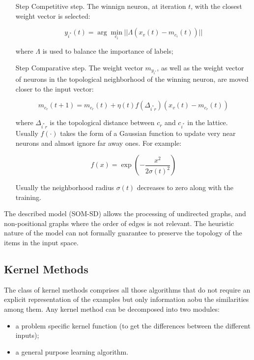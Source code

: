 \begin{enumerate}
	\item[Step] Competitive step. The winnign neuron, at
		iteration $t$, with the closest weight vector is selected:

		\begin{equation}
			y_{i^*}(t) = \arg \min_{c_i} || \Lambda (x_v(t) - m_{c_i}(t))||
		\end{equation}

		where $\Lambda$ is used to balance the importance of labels;

	\item[Step] Comparative step. The weight vector $m_{y_{i^*}}$, as well as
		the weight vector of neurons in the topological neighborhood of the 
		winning neuron, are moved closer to the input vector:

		\begin{equation}
			m_{c_r}(t+1) = m_{c_r}(t) + \eta (t)f(\Delta_{i^*r})(x_v(t)-m_{c_r}(t))
		\end{equation}

		where $\Delta_{i^*r}$ is the topological distance between $c_r$ and
		$c_{i^*}$ in the lattice. Usually $f(\cdot)$ takes the form of a
		Gaussian function to update very near neurons and almost ignore far away
		ones. For example:

		\begin{equation}
			f(x) = \exp\left(-\frac{x^2}{2\sigma(t)^2}\right)
		\end{equation}

		Usually the neighborhood radius $\sigma(t)$ decreases to zero along with
		the training.
\end{enumerate}

The described model (SOM-SD) allows the processing of undirected graphs, and
non-positional  graphs where the order of edges is not relevant. The heuristic
nature of the model can not formally guarantee to preserve the topology of the
items in the input space.

\subsection{Kernel Methods}

The class of kernel methods comprises all those algorithms that do not require
an explicit representation of the examples but only information aobu the
similarities among them. Any kernel method can be decomposed into two modules:
\begin{itemize}
	\item a problem specific kernel function (to get the differences between the
		different inputs);

	\item a general purpose learning algorithm.
\end{itemize}

